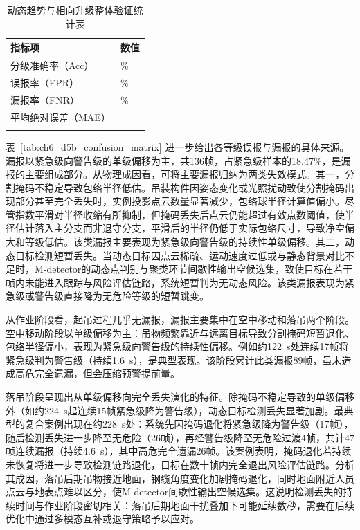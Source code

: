 \begin{table}[htbp]
\centering
\caption{动态趋势与相向升级整体验证统计表}
\label{tab:ch6_d5_dynamic_warning_overall}
\begin{tabular*}{0.7\textwidth}{@{\extracolsep{\fill}}>{\centering\arraybackslash}m{5.5cm}>{\centering\arraybackslash}m{3.5cm}}
\Xhline{1pt}
\textbf{指标项} & \textbf{数值} \\
\hline
分级准确率（Acc） & 86.65\% \\
误报率（FPR） & 5.35\% \\
漏报率（FNR） & 8.00\% \\
平均绝对误差（MAE） & 0.2002 \\
\Xhline{1pt}
\end{tabular*}
\end{table}

表~\ref{tab:ch6_d5b_confusion_matrix} 进一步给出各等级误报与漏报的具体来源。漏报以紧急级向警告级的单级偏移为主，共136帧，占紧急级样本的18.47\%，是漏报的主要组成部分。从物理成因看，可将主要漏报归纳为两类失效模式。其一，分割掩码不稳定导致包络半径低估。吊装构件因姿态变化或光照扰动致使分割掩码出现部分甚至完全丢失时，实例投影点云数量显著减少，包络球半径计算值偏小。尽管指数平滑对半径收缩有所抑制，但掩码丢失后点云仍能超过有效点数阈值，使半径估计落入主分支而非退守分支，平滑后的半径仍低于实际包络尺寸，导致净空偏大和等级低估。该类漏报主要表现为紧急级向警告级的持续性单级偏移。其二，动态目标检测短暂丢失。当动态目标因点云稀疏、运动速度过低或与静态背景对比不足时，M-detector的动态点判别与聚类环节间歇性输出空候选集，致使目标在若干帧内未能进入跟踪与风险评估链路，系统短暂判为无动态风险。该类漏报表现为紧急级或警告级直接降为无危险等级的短暂跳变。

从作业阶段看，起吊过程几乎无漏报，漏报主要集中在空中移动和落吊两个阶段。空中移动阶段以单级偏移为主：吊物频繁靠近与远离目标导致分割掩码短暂退化、包络半径偏小，表现为紧急级向警告级的持续性偏移。例如约122~s处连续17帧将紧急级判为警告级（持续1.6~s），是典型表现。该阶段累计此类漏报89帧，虽未造成高危完全遗漏，但会压缩预警提前量。

落吊阶段呈现出从单级偏移向完全丢失演化的特征。除掩码不稳定导致的单级偏移外（如约224~s起连续15帧紧急级降为警告级），动态目标检测丢失显著加剧。最典型的复合案例出现在约228~s处：系统先因掩码退化将紧急级降为警告级（17帧），随后检测丢失进一步降至无危险（26帧），再经警告级降至无危险过渡4帧，共计47帧连续漏报（持续4.6~s），其中高危完全遗漏26帧。该案例表明，掩码退化若持续未恢复将进一步导致检测链路退化，目标在数十帧内完全退出风险评估链路。分析其成因，落吊后期吊物接近地面，钢缆角度变化加剧掩码退化，同时地面附近人员点云与地表点难以区分，使M-detector间歇性输出空候选集。这说明检测丢失的持续时间与作业阶段密切相关：落吊后期地面干扰叠加下可能延续数秒，需要在后续优化中通过多模态互补或退守策略予以应对。

